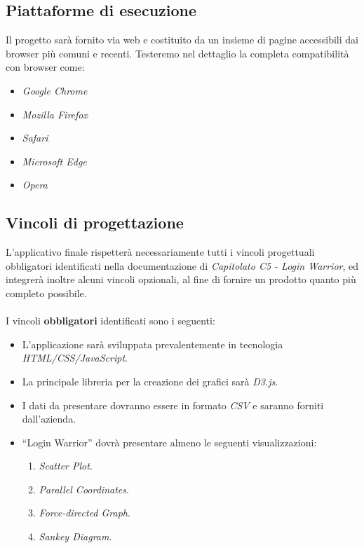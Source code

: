 \subsection{Piattaforme di esecuzione}

Il progetto sarà fornito via web e costituito da un insieme di pagine accessibili dai browser più comuni e recenti. Testeremo nel dettaglio la completa compatibilità con browser come:
\begin{itemize}
\item \textit{Google Chrome}
\item \textit{Mozilla Firefox}
\item \textit{Safari}
\item \textit{Microsoft Edge}
\item \textit{Opera}
\end{itemize}


\subsection{Vincoli di progettazione}

L'applicativo finale rispetterà necessariamente tutti i vincoli progettuali obbligatori identificati nella documentazione di \textit{Capitolato C5 - Login Warrior}, ed integrerà inoltre alcuni vincoli opzionali, al fine di fornire un prodotto quanto più completo possibile. \\ \\
I vincoli \textbf{obbligatori} identificati sono i seguenti:
\begin{itemize}
	\item L’applicazione sarà sviluppata prevalentemente in tecnologia 				\textit{HTML/CSS/JavaScript}.
	\item La principale libreria per la creazione dei grafici sarà \textit{D3.js}.
	\item I dati da presentare dovranno essere in formato \textit{CSV} e saranno forniti 
			dall'azienda.
	\item “Login Warrior” dovrà presentare almeno le seguenti visualizzazioni:
		 \begin{enumerate}
                    \item \textit{Scatter Plot}.
                    \item \textit{Parallel Coordinates}.
                    \item \textit{Force-directed Graph}.
                    \item \textit{Sankey Diagram}. \\
		\end{enumerate}
\end{itemize}

